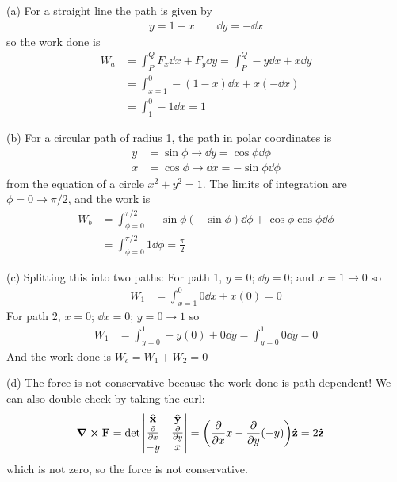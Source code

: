 \documentclass[../hw.tex]{subfiles}
\begin{document}
(a) For a straight line the path is given by
\begin{align*}
  y = 1 - x \qquad \dd{y} = -\dd{x}
\end{align*}
so the work done is
\begin{align*}
  W_a &= \int_P^Q F_x \dd{x} + F_y \dd{y} = \int_P^Q -y \dd{x} + x \dd{y} \\
  &= \int_{x=1}^0 -(1 - x) \dd{x} + x (-\dd{x}) \\
  &= \int_1^0 -1 \dd{x} = 1
\end{align*}

(b) For a circular path of radius 1, the path in polar coordinates is
\begin{align*}
  y &= \sin\phi \to \dd{y} = \cos\phi \dd{\phi} \\
  x &= \cos\phi \to \dd{x} = -\sin\phi \dd{\phi}
\end{align*}
from the equation of a circle $x^2 + y^2 = 1$. The limits of integration are $\phi = 0 \to \pi/2$,
and the work is
\begin{align*}
  W_b &= \int_{\phi=0}^{\pi/2} -\sin\phi(-\sin\phi) \dd{\phi} + \cos\phi \cos\phi \dd{\phi} \\
  &= \int_{\phi=0}^{\pi/2} 1 \dd{\phi} = \frac{\pi}{2}
\end{align*}

(c) Splitting this into two paths: For path 1, $y = 0$; $\dd{y} = 0$; and $x = 1 \to 0$ so
\begin{align*}
  W_1 &= \int_{x=1}^0 0 \dd{x} + x(0) = 0
\end{align*}
For path 2, $x = 0$; $\dd{x} = 0$; $y = 0 \to 1$ so
\begin{align*}
W_1 &= \int_{y=0}^1 -y(0) + 0 \dd{y} = \int_{y=0}^1 0 \dd{y} = 0
\end{align*}
And the work done is $W_c = W_1 + W_2 = 0$

(d) The force is not conservative because the work done is path dependent! We can also double check
by taking the curl:
\begin{align*}
  \curl \vb{F} &= \det \begin{vmatrix}
    \vu{x} & \vu{y} \\
    \pdv{x} & \pdv{y} \\
    -y & x
  \end{vmatrix}
  = \qt(\pdv{x} x  - \pdv{y} (-y)) \vu{z} = 2 \vu{z}
\end{align*}
which is not zero, so the force is not conservative.

\newpage
\end{document}
